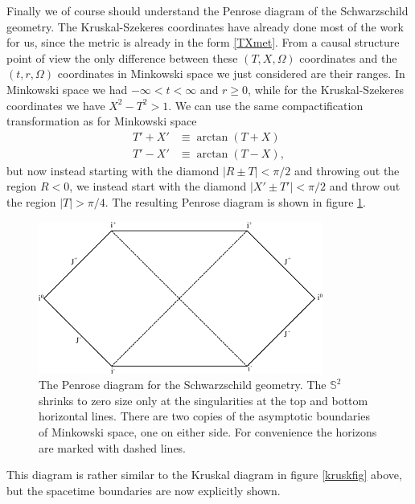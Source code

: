 \documentclass[12pt]{article}
\begin{document}
Finally we of course should understand the Penrose diagram of the Schwarzschild geometry.  The Kruskal-Szekeres coordinates have already done most of the work for us, since the metric is already in the form \eqref{TXmet}.  From a causal structure point of view the only difference between these $(T,X,\Omega)$ coordinates and the $(t,r,\Omega)$ coordinates in Minkowski space we just considered are their ranges.  In Minkowski space we had $-\infty <t<\infty$ and $r\geq0$, while for the Kruskal-Szekeres coordinates we have $X^2-T^2>1$.  We can use the same compactification transformation as for Minkowski space
\begin{align}\nonumber
T'+X'&\equiv \arctan (T+X)\\
T'-X'&\equiv \arctan (T-X),
\end{align} 
but now instead starting with the diamond $|R\pm T|<\pi/2$ and throwing out the region $R<0$, we instead start with the diamond $|X'\pm T'|<\pi/2$ and throw out the region $|T|>\pi/4$.  The resulting Penrose diagram is shown in figure \ref{schpenrose}.
\begin{figure}
\begin{center}
\includegraphics[height=5cm]{schpenrose.pdf}
\caption{The Penrose diagram for the Schwarzschild geometry.  The $\mathbb{S}^2$ shrinks to zero size only at the singularities at the top and bottom horizontal lines.  There are two copies of the asymptotic boundaries of Minkowski space, one on either side.  For convenience the horizons are marked with dashed lines.}\label{schpenrose}
\end{center}
\end{figure}
This diagram is rather similar to the Kruskal diagram in figure \ref{kruskfig} above, but the spacetime boundaries are now explicitly shown.  
\end{document}

